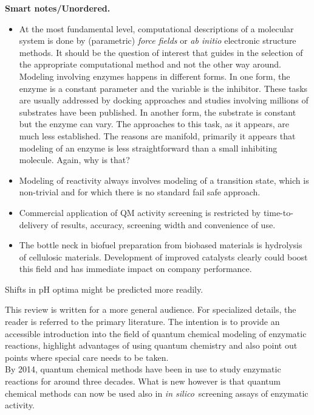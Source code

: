 \textbf{Smart notes/Unordered.}
\begin{itemize}
\item At the most fundamental level, computational descriptions of a molecular system is done by (parametric) \textit{force fields} or \textit{ab initio} electronic structure methods.
It should be the question of interest that guides in the selection of the appropriate computational method and not the other way around.\\
Modeling involving enzymes happens in different forms.
In one form, the enzyme is a constant parameter and the variable is the inhibitor.
These tasks are usually addressed by docking approaches and studies involving millions of substrates have been published\cite{zhou2010high}.
In another form, the substrate is constant but the enzyme can vary.
The approaches to this task, as it appears, are much less established.
The reasons are manifold, primarily it appears that modeling of an enzyme is less straightforward than a small inhibiting molecule.
Again, why is that?
\item Modeling of reactivity always involves modeling of a transition state, which is non-trivial and for which there is no standard fail safe approach.
\item Commercial application of QM activity screening is restricted by time-to-delivery of results, accuracy, screening width and convenience of use.
\item The bottle neck in biofuel preparation from biobased materials is hydrolysis of cellulosic materials. Development of improved catalysts clearly could boost this field and has immediate impact on company performance.
\end{itemize}



Shifts in pH optima might be predicted more readily\cite{ludwiczek2013strategies}.

This review is written for a more general audience.
For specialized details, the reader is referred to the primary literature.
The intention is to provide an accessible introduction into the field of quantum chemical modeling of enzymatic reactions, highlight advantages of using quantum chemistry and also point out points where special care needs to be taken.\\

By 2014, quantum chemical methods have been in use to study enzymatic reactions for around three decades.
What is new however is that quantum chemical methods can now be used also in \textit{in silico} screening assays of enzymatic activity.

